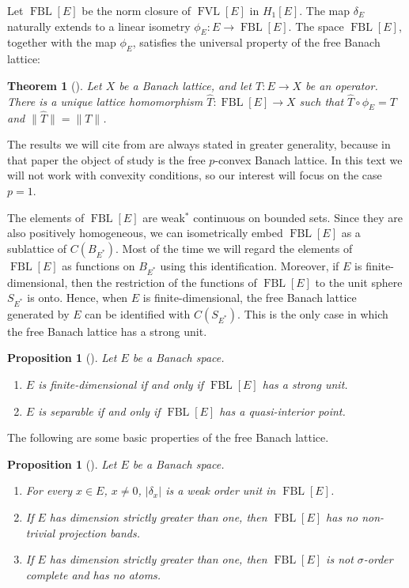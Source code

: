\documentclass{memo-l}
\newtheorem{thm}[theorem]{Theorem}
\newtheorem{prop}[theorem]{Proposition}
\theoremstyle{definition}
\theoremstyle{remark}
\numberwithin{section}{chapter}
\numberwithin{equation}{chapter}
\newcommand{\FVLv}[1]{\operatorname{FVL}[#1]}
\newcommand{\FBL}[1]{\operatorname{FBL}[#1]}
\begin{document}
Let $\FBL E$ be the norm closure of $\FVLv E$ in $H_1[E]$. The map $\delta
_E$ naturally extends to a linear isometry $\phi _E\colon E\to \FBL
E$. The space $\FBL E$, together with the map $\phi _E$, satisfies the
universal property of the free Banach lattice:

\begin{thm}[{\cite[Theorem 2.1]{oikhberg_etal2022}}]
    Let $X$ be a Banach lattice, and let $T\colon E\to X$ be an
    operator. There is a unique lattice homomorphism $\hat{T}\colon
    \FBL E\to X$ such that $\hat{T}\circ \phi _E=T$ and
    $\|\hat{T}\|= \|T\|$.
\end{thm}

The results we will cite from \cite{oikhberg_etal2022} are always
stated in greater generality, because in that paper the object of study is the free $p$-convex Banach lattice. In this text we will not work with convexity
conditions, so our interest will focus on the case $p=1$.

The elements of $\FBL E$ are weak$^*$ continuous on bounded sets.
Since they are also positively homogeneous, we can isometrically embed
$\FBL E$ as a sublattice of $C(B_{E^{*}})$. Most of the time we will
regard the elements of $\FBL E$ as functions on $B_{E^{*}}$ using this
identification. Moreover, if $E$ is finite-dimensional, then the
restriction of the functions of $\FBL E$ to the unit sphere
$S_{E^{*}}$ is onto. Hence, when $E$ is finite-dimensional, the free
Banach lattice generated by $E$ can be identified with $C(S_{E^{*}})$.
This is the only case in which the free Banach lattice has a strong
unit.

\begin{prop}[{\cite[Propositions 9.1 and 9.4]{oikhberg_etal2022}}]\label{prop:FBL_strong_unit}
    Let $E$ be a Banach space.
    \begin{enumerate}
        \item $E$ is finite-dimensional if and only if $\FBL E$ has a
            strong unit.
        \item $E$ is separable if and only if $\FBL E$ has a
            quasi-interior point.
    \end{enumerate}
\end{prop}

The following are some basic properties of the free Banach lattice.

\begin{prop}[{\cite[Proposition 2.11]{oikhberg_etal2022}}]\label{prop:FBL_basic}
    Let $E$ be a Banach space.
    \begin{enumerate}
        \item For every $x \in E$, $x\neq 0$, $|\delta _x|$ is a weak
            order unit in $\FBL E$.
        \item If $E$ has dimension strictly greater than one, then
            $\FBL E$ has no non-trivial projection bands.
        \item If $E$ has dimension strictly greater than one, then
            $\FBL E$ is not $\sigma $-order complete and has no atoms.
    \end{enumerate}
\end{prop}
\end{document}
